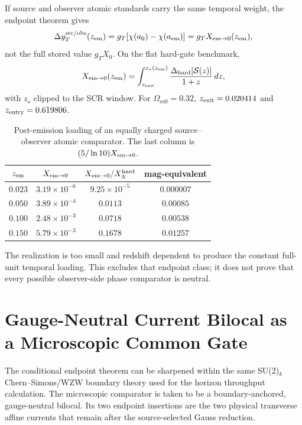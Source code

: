 \documentclass[aps,prd,twocolumn,10pt,superscriptaddress,nofootinbib]{revtex4-2}
\begin{document}
If source and observer atomic standards carry the same temporal weight, the
endpoint theorem gives
\begin{equation}
\Delta y_T^{\rm src/obs}(z_{\rm em})
=g_T[\chi(a_0)-\chi(a_{\rm em})]
=g_TX_{\rm em\to0}(z_{\rm em}),
\label{eq:pb_emission_response}
\end{equation}
not the full stored value $g_TX_0$.  On the flat hard-gate benchmark,
\begin{equation}
X_{\rm em\to0}(z_{\rm em})
=\int_{z_{\rm exit}}^{z_\star(z_{\rm em})}
\frac{\Delta_{\rm hard}[\mathcal S(z)]}{1+z}\,dz,
\label{eq:pb_post_emission}
\end{equation}
with $z_\star$ clipped to the SCR window.  For $\Omega_{m0}=0.32$,
$z_{\rm exit}=0.020414$ and $z_{\rm entry}=0.619806$.
\begin{table}[!htbp]
\centering
\scriptsize
\begin{tabular}{@{}cccc@{}}
\hline\hline
$z_{\rm em}$ & $X_{\rm em\to0}$ & $X_{\rm em\to0}/X_\Lambda^{\rm hard}$
& mag-equivalent \\
\hline
$0.023$ & $3.19\times10^{-6}$ & $9.25\times10^{-5}$ & $0.000007$ \\
$0.050$ & $3.89\times10^{-4}$ & $0.0113$ & $0.00085$ \\
$0.100$ & $2.48\times10^{-3}$ & $0.0718$ & $0.00538$ \\
$0.150$ & $5.79\times10^{-3}$ & $0.1678$ & $0.01257$ \\
\hline\hline
\end{tabular}
\caption{Post-emission loading of an equally charged source--observer
atomic comparator.  The last column is $(5/\ln10)X_{\rm em\to0}$.}
\label{tab:pb_post_emission}
\end{table}
The realization is too small and redshift dependent to produce the constant
full-unit temporal loading.  This excludes that endpoint class; it does not
prove that every possible observer-side phase comparator is neutral.



\section{Gauge-Neutral Current Bilocal as a Microscopic Common Gate}
\label{sec:bilocal_completion}

The conditional endpoint theorem can be sharpened within the same
SU(2)$_k$ Chern--Simons/WZW boundary theory used for the horizon
throughput calculation.  The microscopic comparator is taken to be a
boundary-anchored, gauge-neutral bilocal.  Its two endpoint insertions are
the two physical transverse affine currents that remain after the
source-selected Gauss reduction.
\end{document}
